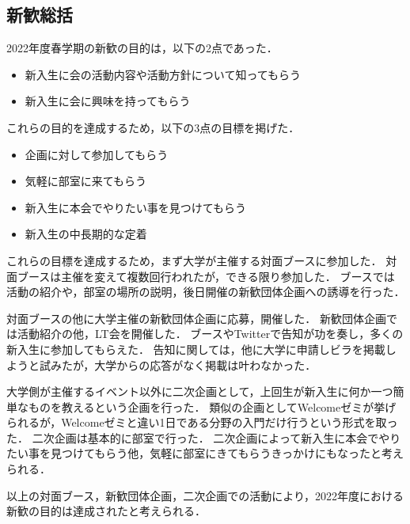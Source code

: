 \subsection*{新歓総括}


2022年度春学期の新歓の目的は，以下の2点であった．

\begin{itemize}
    \item 新入生に会の活動内容や活動方針について知ってもらう
    \item 新入生に会に興味を持ってもらう
\end{itemize}

これらの目的を達成するため，以下の3点の目標を掲げた．

\begin{itemize}
    \item 企画に対して参加してもらう
    \item 気軽に部室に来てもらう
    \item 新入生に本会でやりたい事を見つけてもらう
    \item 新入生の中長期的な定着
\end{itemize}

これらの目標を達成するため，まず大学が主催する対面ブースに参加した．
対面ブースは主催を変えて複数回行われたが，できる限り参加した．
ブースでは活動の紹介や，部室の場所の説明，後日開催の新歓団体企画への誘導を行った．

対面ブースの他に大学主催の新歓団体企画に応募，開催した．
新歓団体企画では活動紹介の他，LT会を開催した．
ブースやTwitterで告知が功を奏し，多くの新入生に参加してもらえた．
告知に関しては，他に大学に申請しビラを掲載しようと試みたが，大学からの応答がなく掲載は叶わなかった．

大学側が主催するイベント以外に二次企画として，上回生が新入生に何か一つ簡単なものを教えるという企画を行った．
類似の企画としてWelcomeゼミが挙げられるが，Welcomeゼミと違い1日である分野の入門だけ行うという形式を取った．
二次企画は基本的に部室で行った．
二次企画によって新入生に本会でやりたい事を見つけてもらう他，気軽に部室にきてもらうきっかけにもなったと考えられる．

以上の対面ブース，新歓団体企画，二次企画での活動により，2022年度における新歓の目的は達成されたと考えられる．
